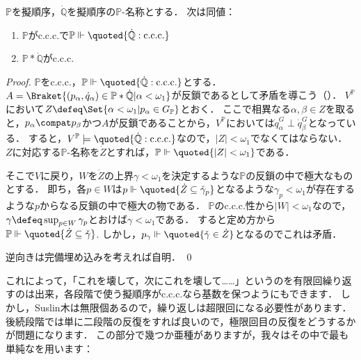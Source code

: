 \documentclass[a4j]{ltjsarticle}
\renewcommand{\emph}[1]{\textsf{\textgt{#1}}}
\begin{document}
\begin{lemma}
 $\mathbb{P}$を擬順序，$\dot{\mathbb{Q}}$を擬順序の$\mathbb{P}$-名称とする．
 次は同値：
 \begin{enumerate}
  \item $\mathbb{P}$がc.c.c.で$\mathbb{P} \Vdash \quoted{\dot{\mathbb{Q}}: \text{c.c.c.}}$
  \item $\mathbb{P} \ast \dot{\mathbb{Q}}$がc.c.c.
 \end{enumerate}
\end{lemma}
\begin{proof}
 $\mathbb{P}$をc.c.c.，$\mathbb{P} \Vdash \quoted{\dot{\mathbb{Q}}: \text{c.c.c.}}$とする．$A = \Braket{ (p_\alpha , \dot{q}_\alpha) \in \mathbb{P} \ast \dot{\mathbb{Q}} | \alpha < \omega_1}$が反鎖であるとして矛盾を導こう（\emph{背理法}）．
 $V^{\mathbb{P}}$において$Z \defeq \Set{\alpha < \omega_1 | p_\alpha \in G_{\mathbb{P}}}$とおく．
 ここで相異なる$\alpha, \beta \in Z$を取ると，$p_\alpha \compat p_\beta$かつ$A$が反鎖であることから，$V^{\mathbb{P}}$においては$\dot{q}_\alpha^G \perp \dot{q}_\beta^G$となっている．
 すると，$V^{\mathbb{P}} \models \quoted{\dot{\mathbb{Q}}: \text{c.c.c.}}$なので，$|Z| < \omega_1$でなくてはならない．
 $Z$に対応する$\mathbb{P}$-名称を$\dot{Z}$とすれば，$\mathbb{P} \Vdash \quoted{|Z| < \omega_1}$である．

 そこで$V$に戻り，$W$を$\dot{Z}$の上界$\gamma < \omega_1$を決定するような$\mathbb{P}$の反鎖の中で極大なものとする．
 即ち，各$p \in W$は$p \Vdash \quoted{\dot{Z} \subseteq \check{\gamma}_p}$となるような$\gamma_p < \omega_1$が存在するような$p$からなる反鎖の中で極大の物である．
 $\mathbb{P}$のc.c.c.性から$|W| < \omega_1$なので，$\gamma \defeq \sup_{p \in W} \gamma_p$とおけば$\gamma < \omega_1$である．
 すると定め方から$\mathbb{P} \Vdash \quoted{\dot{Z} \subseteq \check{\gamma}}$.
 しかし，$p_\gamma \Vdash \quoted{\check{\gamma} \in \dot{Z}}$となるのでこれは矛盾．

 逆向きは完備埋め込みを考えれば自明． \qed
\end{proof}

これによって，「これを壊して，次にこれを壊して……」というのを有限回繰り返すのは出来，各段階で使う擬順序がc.c.c.なら基数を保つようにもできます．
しかし，Suslin木は無限個あるので，繰り返しは超限回になる必要性があります．
後続段階では単に二段階の反復をすれば良いので，極限回目の反復をどうするかが問題になります．
この部分で幾つか亜種がありますが，我々はその中で最も単純な\emph{有限台反復}を用います：
\end{document}

